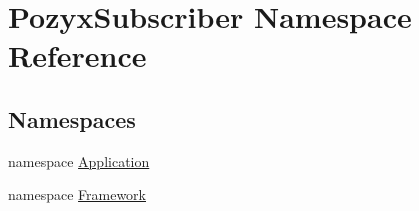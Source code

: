 \hypertarget{namespace_pozyx_subscriber}{}\section{Pozyx\+Subscriber Namespace Reference}
\label{namespace_pozyx_subscriber}
\subsection*{Namespaces}
\begin{DoxyCompactItemize}
\item 
namespace \hyperlink{namespace_pozyx_subscriber_1_1_application}{Application}
\item 
namespace \hyperlink{namespace_pozyx_subscriber_1_1_framework}{Framework}
\end{DoxyCompactItemize}
